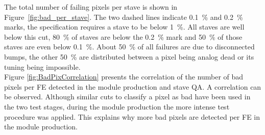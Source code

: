 The total number of failing pixels per stave is shown in Figure~\ref{fig:bad_per_stave}. The two dashed lines indicate \SI{0.1}{\percent} and \SI{0.2}{\percent} marks, the specification requires a stave to be below \SI{1}{\percent}. All staves are well below this cut, \SI{80}{\percent} of staves are below the \SI{0.2}{\percent} mark and \SI{50}{\percent} of those staves are even below \SI{0.1}{\percent}. About \SI{50}{\percent} of all failures are due to disconnected bumps, the other \SI{50}{\percent} are distributed between a pixel being analog dead or its tuning being impossible.\\
Figure \ref{fig:BadPixCorrelation} presents the correlation of the number of bad pixels per FE detected in the module production and stave QA. A correlation can be observed. Although similar cuts to classify a pixel as bad have been used in the two test stages, during the module production the more intense test procedure was applied. This explains why more bad pixels are detected per FE in the module production.


%

